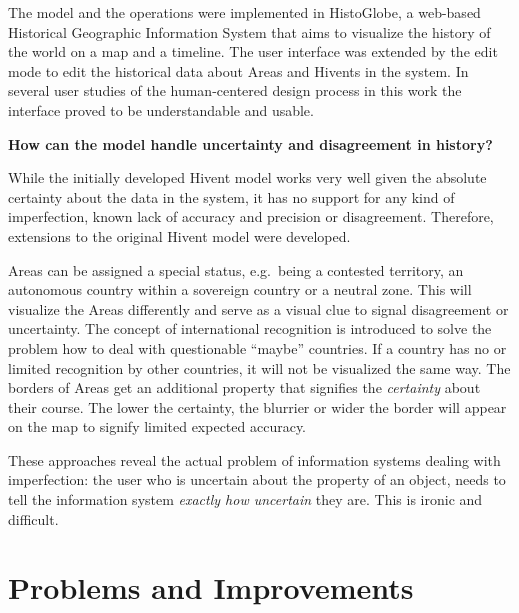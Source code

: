 The model and the operations were implemented in HistoGlobe, a web-based Historical Geographic Information System that aims to visualize the history of the world on a map and a timeline. The user interface was extended by the edit mode to edit the historical data about Areas and Hivents in the system. In several user studies of the human-centered design process in this work the interface proved to be understandable and usable.

\begin{description}[labelindent=0.55em]
  \item[\textbf{3)}]
  \textbf{
    How can the model handle uncertainty and disagreement in history?
  }
\end{description}

While the initially developed Hivent model works very well given the absolute certainty about the data in the system, it has no support for any kind of imperfection, known lack of accuracy and precision or disagreement. Therefore, extensions to the original Hivent model were developed.

Areas can be assigned a special status, e.g.\ being a contested territory, an autonomous country within a sovereign country or a neutral zone. This will visualize the Areas differently and serve as a visual clue to signal disagreement or uncertainty. The concept of international recognition is introduced to solve the problem how to deal with questionable ``maybe'' countries. If a country has no or limited recognition by other countries, it will not be visualized the same way. The borders of Areas get an additional property that signifies the \emph{certainty} about their course. The lower the certainty, the blurrier or wider the border will appear on the map to signify limited expected accuracy.

These approaches reveal the actual problem of information systems dealing with imperfection: the user who is uncertain about the property of an object, needs to tell the information system \emph{exactly how uncertain} they are. This is ironic and difficult.


\section{Problems and Improvements} %
\label{sec:problems}

